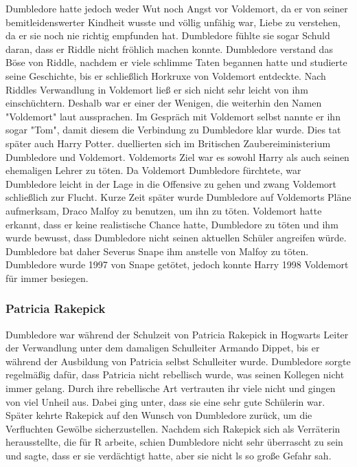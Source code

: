 \documentclass[a4paper, 10pt]{article}
\begin{document}
Dumbledore hatte jedoch weder Wut noch Angst vor Voldemort, da er von seiner bemitleidenswerter Kindheit wusste und völlig unfähig war, Liebe zu verstehen, da er sie noch nie richtig empfunden hat. Dumbledore fühlte sie sogar Schuld daran, dass er Riddle nicht fröhlich machen konnte. Dumbledore verstand das Böse von Riddle, nachdem er viele schlimme Taten begannen hatte und studierte seine Geschichte, bis er schließlich Horkruxe von Voldemort entdeckte. Nach Riddles Verwandlung in Voldemort ließ er sich nicht sehr leicht von ihm einschüchtern. Deshalb war er einer der Wenigen, die weiterhin den Namen "Voldemort" laut aussprachen. Im Gespräch mit Voldemort selbst nannte er ihn sogar "Tom", damit diesem die Verbindung zu Dumbledore klar wurde. Dies tat später auch Harry Potter.
\vspace{10pt}
 duellierten sich im Britischen Zaubereiministerium Dumbledore und Voldemort. Voldemorts Ziel war es sowohl Harry als auch seinen ehemaligen Lehrer zu töten. Da Voldemort Dumbledore fürchtete, war Dumbledore leicht in der Lage in die Offensive zu gehen und zwang Voldemort schließlich zur Flucht. Kurze Zeit später wurde Dumbledore auf Voldemorts Pläne aufmerksam, Draco Malfoy zu benutzen, um ihn zu töten. Voldemort hatte erkannt, dass er keine realistische Chance hatte, Dumbledore zu töten und ihm wurde bewusst, dass Dumbledore nicht seinen aktuellen Schüler angreifen würde. Dumbledore bat daher Severus Snape ihm anstelle von Malfoy zu töten. Dumbledore wurde 1997 von Snape getötet, jedoch konnte Harry 1998 Voldemort für immer besiegen.
\subsubsection*{\large Patricia Rakepick}
Dumbledore war während der Schulzeit von Patricia Rakepick in Hogwarts Leiter der Verwandlung unter dem damaligen Schulleiter Armando Dippet, bis er während der Ausbildung von Patricia selbst Schulleiter wurde. Dumbledore sorgte regelmäßig dafür, dass Patricia nicht rebellisch wurde, was seinen Kollegen nicht immer gelang. Durch ihre rebellische Art vertrauten ihr viele nicht und gingen von viel Unheil aus. Dabei ging unter, dass sie eine sehr gute Schülerin war. Später kehrte Rakepick auf den Wunsch von Dumbledore zurück, um die Verfluchten Gewölbe sicherzustellen.
\vspace{10pt}
\newline
Nachdem sich Rakepick sich als Verräterin herausstellte, die für R arbeite, schien Dumbledore nicht sehr überrascht zu sein und sagte, dass er sie verdächtigt hatte, aber sie nicht ls so große Gefahr sah.
\end{document}
